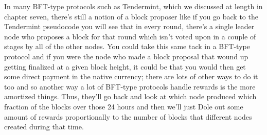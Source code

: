 In many BFT-type protocols such as
Tendermint, which we
discussed at length in chapter seven, there's still a notion of a block
proposer like if you go back to the
Tendermint pseudocode you will see that
in every round, there's a single leader node who proposes a block
for that round which isn't voted upon
in a couple of stages by
all of the other nodes. You could take
this same tack in a BFT-type protocol
and if you were the node
who made a block proposal that wound up
getting finalized at a given block
height, it could be that you would
then get some direct payment in the
native currency; there are lots of other
ways to do it too and so another way a
lot of BFT-type protocols handle rewards
is the more 
amortized things. 
Thus, 
they'll go back and look at which node produced
which fraction of the blocks over those
24 hours and then we'll just 
Dole out some amount of rewards
proportionally to the number of blocks
that different nodes created during that
time.\\


